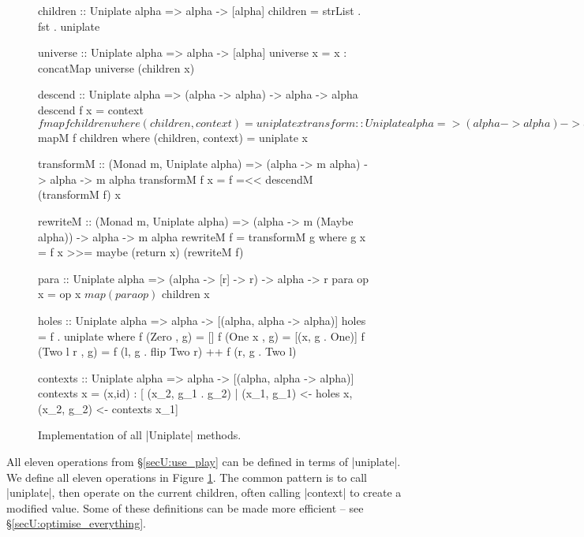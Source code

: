 \begin{figure}
\begin{code}
children :: Uniplate alpha => alpha -> [alpha]
children = strList . fst . uniplate

universe :: Uniplate alpha => alpha -> [alpha]
universe x = x : concatMap universe (children x)

descend :: Uniplate alpha => (alpha -> alpha) -> alpha -> alpha
descend f x = context $ fmap f children
    where (children, context) = uniplate x

transform :: Uniplate alpha => (alpha -> alpha) -> alpha -> alpha
transform f = f . descend (transform f)

rewrite :: Uniplate alpha => (alpha -> Maybe alpha) -> alpha -> alpha
rewrite f = transform g
    where g x = maybe x (rewrite f) (f x)

descendM :: (Monad m, Uniplate alpha) => (alpha -> m alpha) -> alpha -> m alpha
descendM f x = liftM context $ mapM f children
    where (children, context) = uniplate x

transformM :: (Monad m, Uniplate alpha) => (alpha -> m alpha) -> alpha -> m alpha
transformM f x = f =<< descendM (transformM f) x

rewriteM :: (Monad m, Uniplate alpha) => (alpha -> m (Maybe alpha)) -> alpha -> m alpha
rewriteM f = transformM g
    where g x = f x >>= maybe (return x) (rewriteM f)

para :: Uniplate alpha => (alpha -> [r] -> r) -> alpha -> r
para op x = op x $ map (para op) $ children x

holes :: Uniplate alpha => alpha -> [(alpha, alpha -> alpha)]
holes = f . uniplate
  where  f (Zero     , g) = []
         f (One x    , g) = [(x, g . One)]
         f (Two l r  , g) = f (l, g . flip Two r) ++ f (r, g . Two l)

contexts :: Uniplate alpha => alpha -> [(alpha, alpha -> alpha)]
contexts x  =  (x,id) : [ (x_2, g_1 . g_2)
            |  (x_1, g_1) <- holes x, (x_2, g_2) <- contexts x_1]
\end{code}
\caption{Implementation of all |Uniplate| methods.}
\label{fig:Uimplements}
\end{figure}

All eleven operations from \S\ref{secU:use_play} can be defined in terms of |uniplate|. We define all eleven operations in Figure \ref{fig:Uimplements}. The common pattern is to call |uniplate|, then operate on the current children, often calling |context| to create a modified value. Some of these definitions can be made more efficient -- see \S\ref{secU:optimise_everything}.

